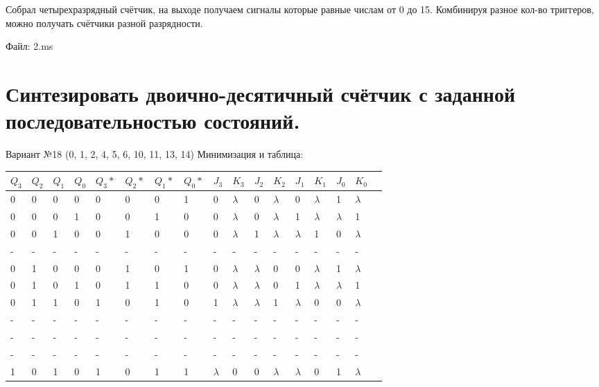 \documentclass[a4paper,12pt]{article}
\begin{document}
\noindent Собрал четырехразрядный счётчик, на выходе получаем сигналы которые равные числам от 0 до 15. Комбинируя разное кол-во триггеров, можно получать счётчики разной разрядности. \newline

\noindent Файл: 2.ms\newline

\section{Синтезировать двоично-десятичный счётчик с заданной последовательностью состояний.}

\noindent Вариант №18 (0, 1, 2, 4, 5, 6, 10, 11, 13, 14)\newline
\noindent Минимизация и таблица:
\begin{center}
	\begin{tabular}{ | l | l | l | l | l | l | l | l | l | l | l | l | l | l | l | l | p{1cm} |}
		\hline
	 	$Q_{3}$ & $Q_{2}$ & $Q_{1}$ & $Q_{0}$ & $Q_{3}*$ & $Q_{2}*$ & $Q_{1}*$ & $Q_{0}*$ & $J_{3}$ & $K_{3}$ & $J_{2}$ & $K_{2}$ & $J_{1}$ & $K_{1}$ & $J_{0}$ & $K_{0}$ \\\hline
	 	0 & 0 & 0 & 0 & 0 & 0 & 0 & 1 & 0 & $\lambda$ & 0 & $\lambda$ & 0 & $\lambda$ & 1 & $\lambda$ \\\hline
	 	0 & 0 & 0 & 1 & 0 & 0 & 1 & 0 & 0 & $\lambda$ & 0 & $\lambda$ & 1 & $\lambda$ & $\lambda$ & 1 \\\hline
	 	0 & 0 & 1 & 0 & 0 & 1 & 0 & 0 & 0 & $\lambda$ & 1 & $\lambda$ & $\lambda$ & 1 & 0 & $\lambda$ \\\hline
	 	- & - & - & - & - & - & - & - & - & - & - & - & - & - & - & - \\\hline
	 	0 & 1 & 0 & 0 & 0 & 1 & 0 & 1 & 0 & $\lambda$ & $\lambda$ & 0 & 0 & $\lambda$ & 1 & $\lambda$ \\\hline
	 	0 & 1 & 0 & 1 & 0 & 1 & 1 & 0 & 0 & $\lambda$ & $\lambda$ & 0 & 1 & $\lambda$ & $\lambda$ & 1 \\\hline
	 	0 & 1 & 1 & 0 & 1 & 0 & 1 & 0 & 1 & $\lambda$ & $\lambda$ & 1 & $\lambda$ & 0 & 0 & $\lambda$ \\\hline
	 	- & - & - & - & - & - & - & - & - & - & - & - & - & - & - & - \\\hline
	 	- & - & - & - & - & - & - & - & - & - & - & - & - & - & - & - \\\hline
	 	- & - & - & - & - & - & - & - & - & - & - & - & - & - & - & - \\\hline
	 	1 & 0 & 1 & 0 & 1 & 0 & 1 & 1 & $\lambda$ & 0 & 0 & $\lambda$ & $\lambda$ & 0 & 1 & $\lambda$ \\\hline

\end{tabular}
\end{center}
\end{document}

